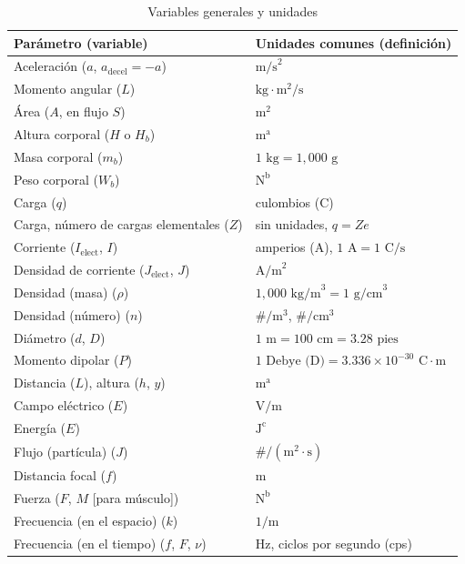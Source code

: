 \documentclass[12pt,a4paper]{book}
\begin{document}
\begin{table}[htbp]
  \centering
  \caption{Variables generales y unidades}
  \label{tab:A.2}
  \begin{tabularx}{\textwidth}{>{\hsize=1.0\hsize}X >{\hsize=1.0\hsize}X}
    \toprule
    \textbf{Parámetro (variable)} & \textbf{Unidades comunes (definición)} \\
    \midrule
    Aceleración ($a$, $a_{\text{decel}} = -a$) & $\text{m/s}^2$ \\
    Momento angular ($L$) & $\text{kg}\cdot\text{m}^2/\text{s}$ \\
    Área ($A$, en flujo $S$) & $\text{m}^2$ \\
    Altura corporal ($H$ o $H_b$) & $\text{m}^{\text{a}}$ \\
    Masa corporal ($m_b$) & $1\text{ kg} = 1,000\text{ g}$ \\
    Peso corporal ($W_b$) & $\text{N}^{\text{b}}$ \\
    Carga ($q$) & culombios (C) \\
    Carga, número de cargas elementales ($Z$) & sin unidades, $q = Ze$ \\
    Corriente ($I_{\text{elect}}$, $I$) & amperios (A), $1\text{ A} = 1\text{ C/s}$ \\
    Densidad de corriente ($J_{\text{elect}}$, $J$) & $\text{A/m}^2$ \\
    Densidad (masa) ($\rho$) & $1,000\text{ kg/m}^3 = 1\text{ g/cm}^3$ \\
    Densidad (número) ($n$) & $\#/\text{m}^3$, $\#/\text{cm}^3$ \\
    Diámetro ($d$, $D$) & $1\text{ m} = 100\text{ cm} = 3.28\text{ pies}$ \\
    Momento dipolar ($P$) & $1\text{ Debye (D)} = 3.336 \times 10^{-30}\text{ C}\cdot\text{m}$ \\
    Distancia ($L$), altura ($h$, $y$) & $\text{m}^{\text{a}}$ \\
    Campo eléctrico ($E$) & $\text{V/m}$ \\
    Energía ($E$) & $\text{J}^{\text{c}}$ \\
    Flujo (partícula) ($J$) & $\#/(\text{m}^2\cdot\text{s})$ \\
    Distancia focal ($f$) & $\text{m}$ \\
    Fuerza ($F$, $M$ [para músculo]) & $\text{N}^{\text{b}}$ \\
    Frecuencia (en el espacio) ($k$) & $1/\text{m}$ \\
    Frecuencia (en el tiempo) ($f$, $F$, $\nu$) & $\text{Hz}$, ciclos por segundo (cps) \\

\end{tabularx}
\end{table}
\end{document}
